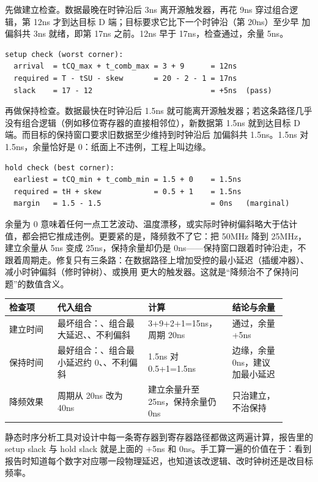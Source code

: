 先做建立检查。数据最晚在时钟沿后 3ns 离开源触发器，再花 9ns 穿过组合逻辑，第 12ns 才到达目标 D 端；目标要求它比下一个时钟沿（第 20ns）至少早  加偏斜共 3ns 就绪，即第 17ns 之前。12ns 早于 17ns，检查通过，余量 5ns。

\begin{lstlisting}
setup check (worst corner):
  arrival  = tCQ_max + t_comb_max = 3 + 9      = 12ns
  required = T - tSU - skew       = 20 - 2 - 1 = 17ns
  slack    = 17 - 12                           = +5ns  (pass)
\end{lstlisting}

再做保持检查。数据最快在时钟沿后 1.5ns 就可能离开源触发器；若这条路径几乎没有组合逻辑（例如移位寄存器的直接相邻位），新数据第 1.5ns 就到达目标 D 端。而目标的保持窗口要求旧数据至少维持到时钟沿后  加偏斜共 1.5ns。1.5ns 对 1.5ns，余量恰好是 0：纸面上不违例，工程上叫边缘。

\begin{lstlisting}
hold check (best corner):
  earliest = tCQ_min + t_comb_min = 1.5 + 0    = 1.5ns
  required = tH + skew            = 0.5 + 1    = 1.5ns
  margin   = 1.5 - 1.5                         = 0ns   (marginal)
\end{lstlisting}

余量为 0 意味着任何一点工艺波动、温度漂移，或实际时钟树偏斜略大于估计值，都会把它推成违例。更要紧的是，降频救不了它：把 50MHz 降到 25MHz，建立余量从 5ns 变成 25ns，保持余量却仍是 0ns——保持窗口跟着时钟沿走，不跟着周期走。修复只有三条路：在数据路径上增加受控的最小延迟（插缓冲器）、减小时钟偏斜（修时钟树）、或换用  更大的触发器。这就是“降频治不了保持问题”的数值含义。

\begin{longtable}{L{0.16\linewidth}L{0.3\linewidth}L{0.26\linewidth}L{0.18\linewidth}}
\toprule
检查项 & 代入组合 & 计算 & 结论与余量 \\
\midrule
建立时间 & 最坏组合：、组合最大延迟、、不利偏斜 & 3+9+2+1=15ns，周期 20ns & 通过，余量 +5ns \\\tablerowrule
保持时间 & 最好组合：、组合最小延迟约 0、、不利偏斜 & 1.5ns 对 0.5+1=1.5ns & 边缘，余量 0ns，建议加最小延迟 \\\tablerowrule
降频效果 & 周期从 20ns 改为 40ns & 建立余量升至 25ns，保持余量仍 0ns & 只治建立，不治保持 \\
\bottomrule
\end{longtable}

静态时序分析工具对设计中每一条寄存器到寄存器路径都做这两遍计算，报告里的 setup slack 与 hold slack 就是上面的 +5ns 和 0ns。手工算一遍的价值在于：看到报告时知道每个数字对应哪一段物理延迟，也知道该改逻辑、改时钟树还是改目标频率。

